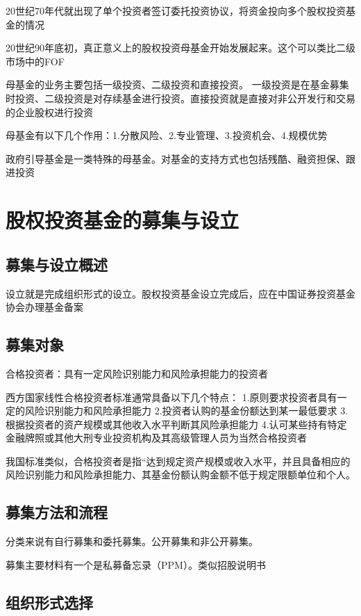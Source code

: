 \documentclass[UTF8,12pt]{ctexbook}
\numberwithin{equation}{section} %
\numberwithin{figure}{section}
\numberwithin{table}{section}
\begin{document}
	20世纪70年代就出现了单个投资者签订委托投资协议，将资金投向多个股权投资基金的情况
	
	20世纪90年底初，真正意义上的股权投资母基金开始发展起来。这个可以类比二级市场中的FOF
	
	母基金的业务主要包括一级投资、二级投资和直接投资。
	一级投资是在基金募集时投资、二级投资是对存续基金进行投资。直接投资就是直接对非公开发行和交易的企业股权进行投资
	
	
	母基金有以下几个作用：1.分散风险、2.专业管理、3.投资机会、4.规模优势
	
	政府引导基金是一类特殊的母基金。对基金的支持方式也包括残酷、融资担保、跟进投资
	
	\section{股权投资基金的募集与设立}
	\subsection{募集与设立概述}
	
	设立就是完成组织形式的设立。股权投资基金设立完成后，应在中国证券投资基金协会办理基金备案
	
	\subsection{募集对象}
	合格投资者：具有一定风险识别能力和风险承担能力的投资者
	
	西方国家线性合格投资者标准通常具备以下几个特点：
	1.原则要求投资者具有一定的风险识别能力和风险承担能力
	2.投资者认购的基金份额达到某一最低要求
	3.根据投资者的资产规模或其他收入水平判断其风险承担能力
	4.认可某些持有特定金融牌照或其他大刑专业投资机构及其高级管理人员为当然合格投资者
	
	我国标准类似，合格投资者是指“达到规定资产规模或收入水平，并且具备相应的风险识别能力和风险承担能力、其基金份额认购金额不低于规定限额单位和个人。
	
	\subsection{募集方法和流程}
	分类来说有自行募集和委托募集。公开募集和非公开募集。
	
	募集主要材料有一个是私募备忘录（PPM）。类似招股说明书
	
	\subsection{组织形式选择}
	
\end{document}
